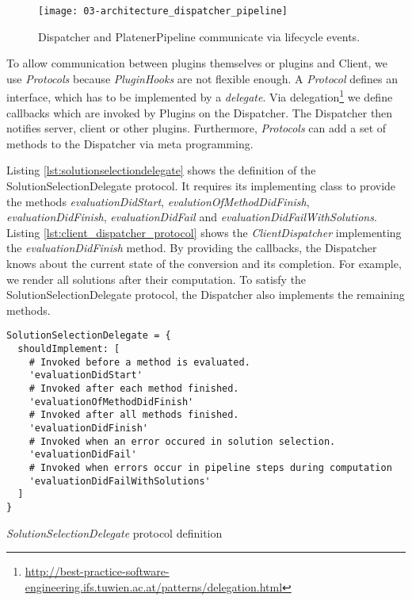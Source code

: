 \documentclass[../ClassicThesis.tex]{subfiles}
\begin{document}
\begin{figure}
\centering
\texttt{[image: 03-architecture\_dispatcher\_pipeline]}
\caption{Dispatcher and PlatenerPipeline communicate via lifecycle events.}
\label{fig:architecture_dispatcher_pipeline}
\end{figure}

To allow communication between plugins themselves or plugins and Client, we use
\emph{Protocols} because \emph{PluginHooks} are not flexible enough. A
\emph{Protocol} defines an interface, which has to be implemented by a
\textit{delegate}. Via
delegation\footnote{\url{http://best-practice-software-engineering.ifs.tuwien.ac.at/patterns/delegation.html}}
we define callbacks which are invoked by Plugins on the Dispatcher. The
Dispatcher then notifies server, client or other plugins. Furthermore,
\emph{Protocols} can add a set of methods to the Dispatcher via meta
programming.

Listing \ref{lst:solutionselectiondelegate} shows the definition of the
SolutionSelectionDelegate protocol. It requires its implementing class to
provide the methods \textit{evaluationDidStart},
\textit{evalutionOfMethodDidFinish}, \textit{evaluationDidFinish},
\textit{evaluationDidFail} and \textit{evaluationDidFailWithSolutions}. Listing
\ref{lst:client_dispatcher_protocol} shows the \emph{ClientDispatcher} implementing the
\textit{evaluationDidFinish} method. By providing the callbacks, the Dispatcher
knows about the current state of the conversion and its completion. For example,
we render all solutions after their computation. To satisfy the
SolutionSelectionDelegate protocol, the Dispatcher also implements the remaining
methods.

\begin{listing}[!h]
\centering
\begin{verbatim}
SolutionSelectionDelegate = {
  shouldImplement: [
    # Invoked before a method is evaluated.
    'evaluationDidStart'
    # Invoked after each method finished.
    'evaluationOfMethodDidFinish'
    # Invoked after all methods finished.
    'evaluationDidFinish'
    # Invoked when an error occured in solution selection.
    'evaluationDidFail'
    # Invoked when errors occur in pipeline steps during computation
    'evaluationDidFailWithSolutions'
  ]
}
\end{verbatim}
\caption{\emph{SolutionSelectionDelegate} protocol definition}
\label{lst:solutionselectiondelegate}
\end{listing}
\end{document}
